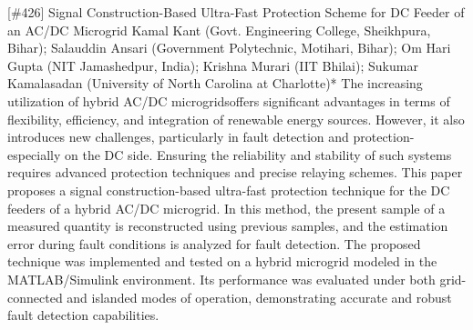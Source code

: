 {} \begin{abstract_online} {[\#426] Signal Construction-Based Ultra-Fast Protection Scheme for DC Feeder of an AC/DC Microgrid} {} {Kamal  Kant (Govt. Engineering College, Sheikhpura, Bihar); Salauddin  Ansari (Government Polytechnic, Motihari, Bihar); Om Hari Gupta (NIT Jamashedpur, India); Krishna  Murari (IIT Bhilai); Sukumar Kamalasadan (University of North Carolina at Charlotte)*} {} The increasing utilization of hybrid AC/DC microgridsoffers significant advantages in terms of flexibility, efficiency, and integration of renewable energy sources. However, it also introduces new challenges, particularly in fault detection and protection-especially on the DC side. Ensuring the reliability and stability of such systems requires advanced protection techniques and precise relaying schemes. This paper proposes a signal construction-based ultra-fast protection technique for the DC feeders of a hybrid AC/DC microgrid. In this method, the present sample of a measured quantity is reconstructed using previous samples, and the estimation error during fault conditions is analyzed for fault detection. The proposed technique was implemented and tested on a hybrid microgrid modeled in the MATLAB/Simulink environment. Its performance was evaluated under both grid-connected and islanded modes of operation, demonstrating accurate and robust fault detection capabilities. \end{abstract_online} 
